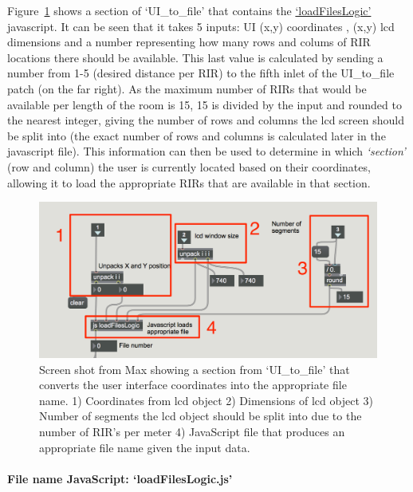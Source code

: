 \documentclass[../../main.tex]{subfiles}
\begin{document}
			Figure~\ref{locationsConvert} shows a section of `UI\_to\_file' that contains the \href{http://lt669.github.io/code/javascript/html/loadFilesLogic.html}{‘loadFilesLogic’} javascript. It can be seen that it takes 5 inputs: UI (x,y) coordinates , (x,y) lcd dimensions and a number representing how many rows and colums of \ac{RIR} locations there should be available. This last value is calculated by sending a number from 1-5 (desired distance per RIR) to the fifth inlet of the UI\_to\_file patch (on the far right). As the maximum number of RIRs that would be available per length of the room is 15, 15 is divided by the input and rounded to the nearest integer, giving the number of rows and columns the lcd screen should be split into (the exact number of rows and columns is calculated later in the javascript file). This information can then be used to determine in which \textit{‘section’} (row and column) the user is currently located based on their coordinates, allowing it to load the appropriate RIRs that are available in that section. 

			\begin{figure}[p]
				\centerline{\includegraphics[width=\textwidth]{Sections/Implementation/Max/images/Max/UI_to_file_edit_4.png}}
				\caption{Screen shot from Max showing a section from ‘UI\_to\_file’ that converts the user interface coordinates into the appropriate file name. 1) Coordinates from lcd object 2) Dimensions of lcd object 3) Number of segments the lcd object should be split into due to the number of \ac{RIR}'s per meter 4) JavaScript file that produces an appropriate file name given the input data.}
				\label{locationsConvert}
			\end{figure}

			\pagebreak
			\paragraph{File name JavaScript: `loadFilesLogic.js'}
\end{document}
